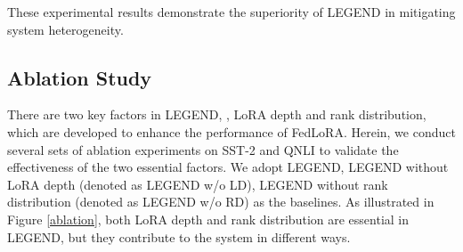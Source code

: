 These experimental results demonstrate the superiority of LEGEND in mitigating system heterogeneity.
\vspace{-0.3cm}





\vspace{-0.1cm}
\subsection{Ablation Study}
\vspace{-0.1cm}
\label{sec-ablation}
There are two key factors in LEGEND, \ie, LoRA depth and rank distribution, which are developed to enhance the performance of FedLoRA.
Herein, we conduct several sets of ablation experiments on SST-2 and QNLI to validate the effectiveness of the two essential factors. 
We adopt LEGEND, LEGEND without LoRA depth (denoted as LEGEND w/o LD), LEGEND without rank distribution (denoted as LEGEND w/o RD) as the baselines.
As illustrated in Figure \ref{ablation}, both LoRA depth and rank distribution are essential in LEGEND, but they contribute to the system in different ways.
